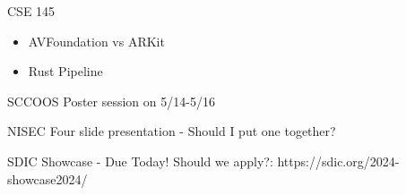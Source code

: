 \begin{frame}{CSE 145}
    \begin{itemize}
        \item AVFoundation vs ARKit
        \item Rust Pipeline
        
    \end{itemize}
\end{frame}

\begin{frame}{SCCOOS}
    Poster session on 5/14-5/16
\end{frame}

\begin{frame}{NISEC}
    Four slide presentation - Should I put one together?
\end{frame}

\begin{frame}{SDIC Showcase - Due Today!}
    Should we apply?: https://sdic.org/2024-showcase2024/
\end{frame}
